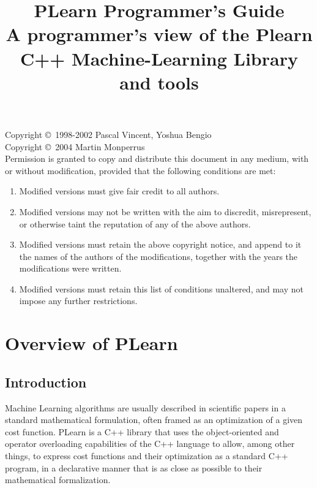 \documentclass[11pt]{book}
\title{\Huge PLearn Programmer's Guide\\ \Large A programmer's view of the Plearn C++ Machine-Learning Library and tools}
\begin{document}
\thispagestyle{empty}

\maketitle

\pagebreak

\vspace*{10cm}



Copyright \copyright\ 1998-2002 Pascal Vincent, Yoshua Bengio \\
Copyright \copyright\ 2004 Martin Monperrus \\

Permission is granted to copy and distribute this document in any medium,
with or without modification, provided that the following conditions are
met:

\begin{enumerate}
\item Modified versions must give fair credit to all authors.
\item Modified versions may not be written with the aim to discredit, misrepresent, or otherwise taint the
      reputation of any of the above authors.
\item Modified versions must retain the above copyright notice, and append to
   it the names of the authors of the modifications, together with the years the
   modifications were written.
\item Modified versions must retain this list of conditions unaltered, 
    and may not impose any further restrictions.
\end{enumerate}


\pagebreak

\tableofcontents

\cleardoublepage\pagebreak
{}


\chapter{ Overview of PLearn}
\section{ Introduction}
 Machine Learning algorithms are usually described in scientific papers in a standard mathematical formulation, often framed as an optimization of a given cost function. PLearn is a C++ library that uses the object-oriented and operator overloading capabilities of the C++ language to allow, among other things, to express cost functions and their optimization as a standard C++ program, in a declarative manner that is as close as possible to their mathematical formalization. 
\end{document}
